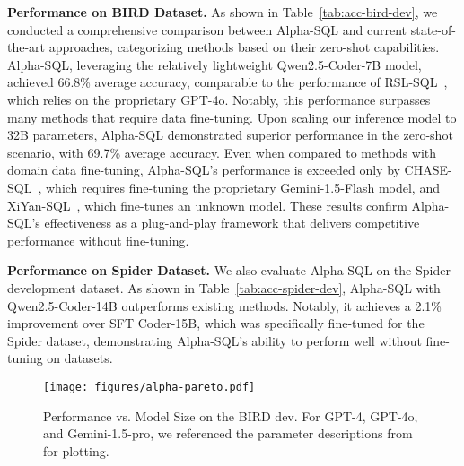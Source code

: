 \textbf{Performance on BIRD Dataset.}
As shown in Table~\ref{tab:acc-bird-dev}, we conducted a comprehensive comparison between Alpha-SQL and current state-of-the-art approaches, categorizing methods based on their zero-shot capabilities. Alpha-SQL, leveraging the relatively lightweight Qwen2.5-Coder-7B model, achieved 66.8\% average accuracy, comparable to the performance of RSL-SQL~\cite{rslsql}, which relies on the proprietary GPT-4o. Notably, this performance surpasses many methods that require data fine-tuning. Upon scaling our inference model to 32B parameters, Alpha-SQL demonstrated superior performance in the zero-shot scenario, with 69.7\% average accuracy. Even when compared to methods with domain data fine-tuning, Alpha-SQL's performance is exceeded only by CHASE-SQL~\cite{CHASE}, which requires fine-tuning the proprietary Gemini-1.5-Flash model, and XiYan-SQL~\cite{XiYan}, which fine-tunes an unknown model. These results confirm Alpha-SQL's effectiveness as a plug-and-play framework that delivers competitive performance without fine-tuning.

\textbf{Performance on Spider Dataset.} We also evaluate Alpha-SQL on the Spider development dataset. As shown in Table~\ref{tab:acc-spider-dev}, Alpha-SQL with Qwen2.5-Coder-14B outperforms existing methods. Notably, it achieves a 2.1\% improvement over SFT Coder-15B, which was specifically fine-tuned for the Spider dataset, demonstrating Alpha-SQL's ability to perform well without fine-tuning on \nlsql datasets.



\begin{figure}[t!]
    \centering
\texttt{[image: figures/alpha-pareto.pdf]}
\vspace{-2.5em}
    \caption{{Performance vs. Model Size on the BIRD dev. For GPT-4, GPT-4o, and Gemini-1.5-pro, we referenced the parameter descriptions from~\cite{asma2024parameters} for plotting.}}
    \label{fig:paretro}
\vspace{-1.5em}
\end{figure}


